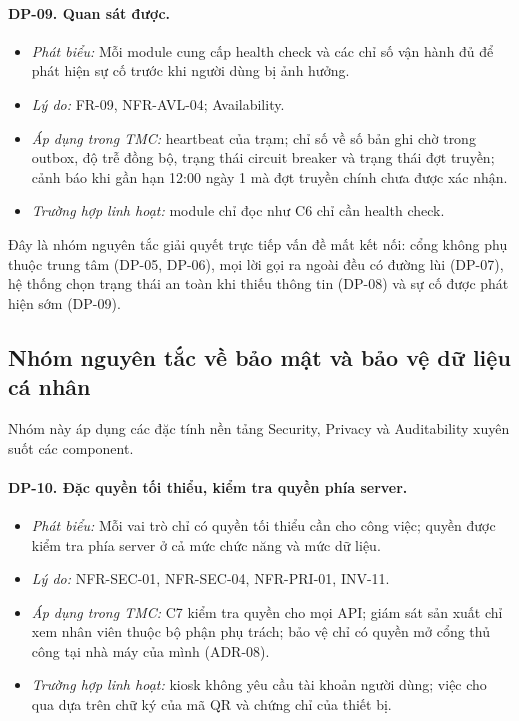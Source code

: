 \paragraph{DP-09. Quan sát được.}\label{dp:09}
\begin{itemize}
    \item \textit{Phát biểu:} Mỗi module cung cấp health check và các chỉ số vận hành đủ để phát hiện sự cố trước khi người dùng bị ảnh hưởng.
    \item \textit{Lý do:} FR-09, NFR-AVL-04; Availability.
    \item \textit{Áp dụng trong TMC:} heartbeat của trạm; chỉ số về số bản ghi chờ trong outbox, độ trễ đồng bộ, trạng thái circuit breaker và trạng thái đợt truyền; cảnh báo khi gần hạn 12:00 ngày 1 mà đợt truyền chính chưa được xác nhận.
    \item \textit{Trường hợp linh hoạt:} module chỉ đọc như C6 chỉ cần health check.
\end{itemize}

Đây là nhóm nguyên tắc giải quyết trực tiếp vấn đề mất kết nối: cổng không phụ thuộc trung tâm (DP-05, DP-06), mọi lời gọi ra ngoài đều có đường lùi (DP-07), hệ thống chọn trạng thái an toàn khi thiếu thông tin (DP-08) và sự cố được phát hiện sớm (DP-09).

\subsection{Nhóm nguyên tắc về bảo mật và bảo vệ dữ liệu cá nhân}\label{sec:dp-security}
Nhóm này áp dụng các đặc tính nền tảng Security, Privacy và Auditability xuyên suốt các component.

\paragraph{DP-10. Đặc quyền tối thiểu, kiểm tra quyền phía server.}\label{dp:10}
\begin{itemize}
    \item \textit{Phát biểu:} Mỗi vai trò chỉ có quyền tối thiểu cần cho công việc; quyền được kiểm tra phía server ở cả mức chức năng và mức dữ liệu.
    \item \textit{Lý do:} NFR-SEC-01, NFR-SEC-04, NFR-PRI-01, INV-11.
    \item \textit{Áp dụng trong TMC:} C7 kiểm tra quyền cho mọi API; giám sát sản xuất chỉ xem nhân viên thuộc bộ phận phụ trách; bảo vệ chỉ có quyền mở cổng thủ công tại nhà máy của mình (ADR-08).
    \item \textit{Trường hợp linh hoạt:} kiosk không yêu cầu tài khoản người dùng; việc cho qua dựa trên chữ ký của mã QR và chứng chỉ của thiết bị.
\end{itemize}

